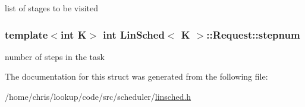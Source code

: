 list of stages to be visited 

\hypertarget{structLinSched_1_1Request_adc40fd35ddf3fceee69c0cd130f76116}{
\subsubsection[{stepnum}]{\setlength{\rightskip}{0pt plus 5cm}template$<$int K$>$ int {\bf Lin\-Sched}$<$ K $>$\-::Request\-::stepnum}}\label{structLinSched_1_1Request_adc40fd35ddf3fceee69c0cd130f76116}


number of steps in the task 



The documentation for this struct was generated from the following file\-:\begin{DoxyCompactItemize}
\item 
/home/chris/lookup/code/src/scheduler/\hyperlink{linsched_8h}{linsched.\-h}\end{DoxyCompactItemize}
